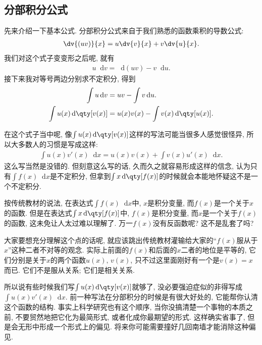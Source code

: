 \documentclass{ctexbook}
\newcommand*{\dif}{\mathop{}\!\mathrm{d}}
\begin{document}
{\subsection{分部积分公式}
先来介绍一下基本公式. 分部积分公式来自于我们熟悉的函数乘积的导数公式: 
\begin{align*}
\dv{(uv)}{x}=u\dv{v}{x}+v\dv{u}{x}
.\end{align*}
我们对这个式子变变形之后呢, 就有
\begin{align*}
u\dif{v}=\dif{(uv)}-v\dif{u}
.\end{align*}
接下来我对等号两边分别求不定积分, 得到
\begin{align*}
\int u\dif{v}={}&uv-\int v\dif{u}.\\
\int u(x)\dif{\qty[v(x)]}={}&u(x)v(x)-\int v(x)\dif{\qty[u(x)]}
.\end{align*}\par
在这个式子当中呢, 像$\int u(x)\dif{\qty[v(x)]}$这样的写法可能当很多人感觉很怪异, 所以大多数人的习惯是写成这样: 
\begin{align*}
\int u(x)v'(x)\dif{x}=u(x)v(x)+\int v(x)u'(x)\dif{x}
.\end{align*}
这么写当然是没错的. 但刻意这么写的话, 久而久之就容易形成这样的信念, 认为只有$\int f(x)\dif{x}$是不定积分, 但拿到$\int x\dif{\qty[f(x)]}$的时候就会本能地怀疑这不是一个不定积分. \par
按传统教材的说法, 在表达式$\int f(x)\dif{x}$中, $x$是积分变量, 而$f(x)$是一个关于$x$的函数. 但是在表达式$\int x\dif{\qty[f(x)]}$中, $f(x)$是积分变量, 而$x$是一个关于$f(x)$的函数, 这未免让人太过难以理解了. 万一$f(x)$没有反函数呢? 这不是乱套了吗? \par
大家要想充分理解这个点的话呢, 就应该跳出传统教材灌输给大家的“$f(x)$服从于$x$”这种二者不对等的观念. 实际上前面的$f(x)$和后面的$x$二者的地位是平等的, 它们分别是关于$x$的两个函数$u(x),\,v(x)$, 只不过这里面刚好有一个是$v(x)=x$而已. 它们不是服从关系; 它们是相关关系. \par
所以说有些时候我们写$\int u(x)\dif{\qty[v(x)]}$就够了, 没必要强迫症似的非得写成$\int u(x)v'(x)\dif{x}$. 前一种写法在分部积分的时候是有很大好处的, 它能帮你认清这个函数的结构. 事实上科学研究也有这个顺序, 当你没搞清楚一个事物的本质之前, 不要贸然地把它化为最简形式, 或者化成你最期望的形式. 这样确实省事了, 但是会无形中形成一个形式上的偏见. 将来你可能需要撞好几回南墙才能消除这种偏见. \par
}
\end{document}
